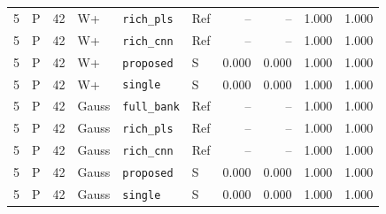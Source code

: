 \documentclass[10pt,a4paper]{article}
\begin{document}
\begin{landscape}
\begin{longtable}{rlrlllrrrr}
5 & P & 42 & W+ & \texttt{rich\_pls} & Ref & -- & -- & 1.000 & 1.000 \\
5 & P & 42 & W+ & \texttt{rich\_cnn} & Ref & -- & -- & 1.000 & 1.000 \\
5 & P & 42 & W+ & \texttt{proposed} & S & 0.000 & 0.000 & 1.000 & 1.000 \\
5 & P & 42 & W+ & \texttt{single} & S & 0.000 & 0.000 & 1.000 & 1.000 \\
5 & P & 42 & Gauss & \texttt{full\_bank} & Ref & -- & -- & 1.000 & 1.000 \\
5 & P & 42 & Gauss & \texttt{rich\_pls} & Ref & -- & -- & 1.000 & 1.000 \\
5 & P & 42 & Gauss & \texttt{rich\_cnn} & Ref & -- & -- & 1.000 & 1.000 \\
5 & P & 42 & Gauss & \texttt{proposed} & S & 0.000 & 0.000 & 1.000 & 1.000 \\
5 & P & 42 & Gauss & \texttt{single} & S & 0.000 & 0.000 & 1.000 & 1.000 \\
\end{longtable}
\endgroup
\end{landscape}
\end{document}
